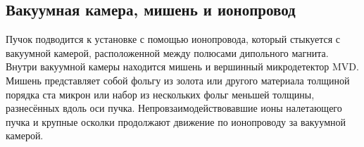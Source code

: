 
\subsection{Вакуумная камера, мишень и ионопровод}\label{sec:secVacChamberPipe}

Пучок подводится к установке с помощью ионопровода, который стыкуется с вакуумной камерой, расположенной между полюсами дипольного магнита. Внутри вакуумной камеры находится мишень и вершинный микродетектор MVD. Мишень представляет собой фольгу из золота или другого материала толщиной порядка ста микрон или набор из нескольких фольг меньшей толщины, разнесённых вдоль оси пучка. Непровзаимодействовавшие ионы налетающего пучка и крупные осколки продолжают движение по ионопроводу за вакуумной камерой.

